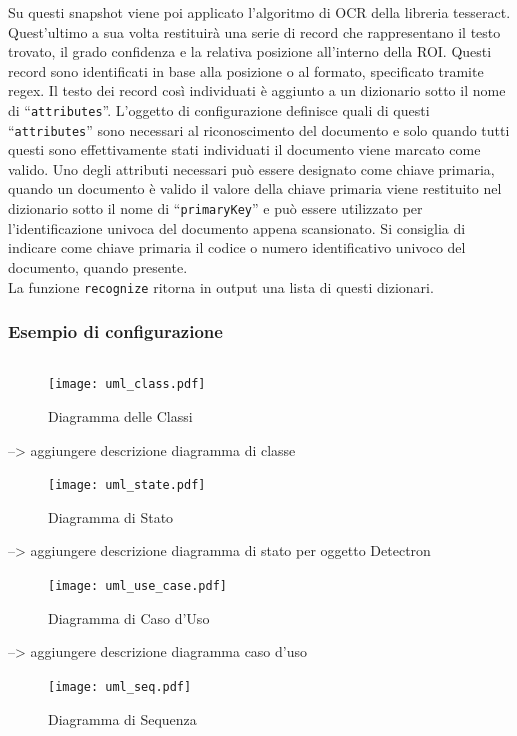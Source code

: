 \documentclass[12pt,a4paper]{article}
\begin{document}
Su questi snapshot viene poi applicato l'algoritmo di OCR della libreria
tesseract. Quest'ultimo a sua volta restituirà una serie di record che
rappresentano il testo trovato, il grado confidenza e la relativa
posizione all'interno della ROI. Questi record sono identificati in base
alla posizione o al formato, specificato tramite regex. Il testo dei
record così individuati è aggiunto a un dizionario sotto il nome di
``\texttt{attributes}''. L'oggetto di configurazione definisce quali di
questi ``\texttt{attributes}'' sono necessari al riconoscimento del
documento e solo quando tutti questi sono effettivamente stati
individuati il documento viene marcato come valido. Uno degli attributi
necessari può essere designato come chiave primaria, quando un documento
è valido il valore della chiave primaria viene restituito nel dizionario
sotto il nome di ``\texttt{primaryKey}'' e può essere utilizzato per
l'identificazione univoca del documento appena scansionato. Si consiglia
di indicare come chiave primaria il codice o numero identificativo
univoco del documento, quando presente.\\
La funzione \texttt{recognize} ritorna in output una lista di questi
dizionari.

\pagebreak

\subsubsection{Esempio di configurazione}
\inputminted{python}{config.py}

\begin{figure}[p]
    \caption{Diagramma delle Classi}
    \centering
    \texttt{[image: uml\_class.pdf]}
\end{figure}

--> aggiungere descrizione diagramma di classe

\begin{figure}[p]
    \caption{Diagramma di Stato}
    \centering
    \texttt{[image: uml\_state.pdf]}
\end{figure}

--> aggiungere descrizione diagramma di stato per oggetto Detectron

\begin{figure}[p]
    \caption{Diagramma di Caso d'Uso}
    \centering
    \texttt{[image: uml\_use\_case.pdf]}
\end{figure}

--> aggiungere descrizione diagramma caso d'uso

\begin{figure}[p]
    \caption{Diagramma di Sequenza}
    \centering
    \texttt{[image: uml\_seq.pdf]}
\end{figure}
\end{document}
